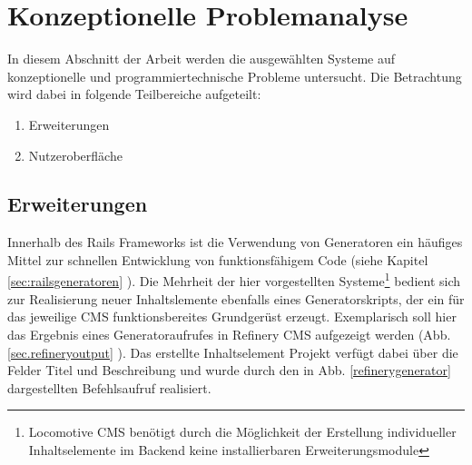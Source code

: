 \chapter{Konzeptionelle Problemanalyse}
\label{chap:probleme}
In diesem Abschnitt der Arbeit werden die ausgewählten Systeme auf konzeptionelle und programmiertechnische Probleme untersucht. Die Betrachtung wird dabei in folgende Teilbereiche aufgeteilt:

\begin{enumerate}
\item Erweiterungen
\item Nutzeroberfläche
\end{enumerate}


\section{Erweiterungen}
\label{dryverstoss}
Innerhalb des Rails Frameworks ist die Verwendung von Generatoren ein häufiges Mittel zur schnellen Entwicklung von funktionsfähigem Code (siehe Kapitel \ref{sec:railsgeneratoren} ). Die Mehrheit der hier vorgestellten Systeme\footnote{Locomotive CMS benötigt durch die Möglichkeit der Erstellung individueller Inhaltselemente im Backend keine installierbaren Erweiterungsmodule} bedient sich zur Realisierung neuer Inhaltslemente ebenfalls eines Generatorskripts, der ein für das jeweilige CMS funktionsbereites Grundgerüst erzeugt. Exemplarisch soll hier das Ergebnis eines Generatoraufrufes in Refinery CMS aufgezeigt werden (Abb. \ref{sec.refineryoutput} ). Das erstellte Inhaltselement Projekt verfügt dabei über die Felder Titel und Beschreibung und wurde durch den in Abb. \ref{refinerygenerator} dargestellten Befehlsaufruf realisiert.






